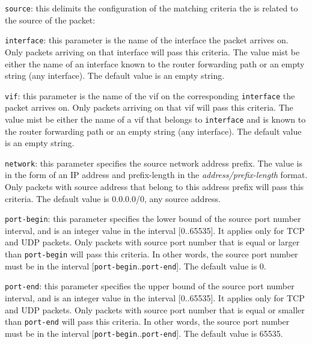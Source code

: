 \begin{description}
\begin{description}
\item{\tt source}: this delimits the configuration of the matching
  criteria the is related to the source of the packet:
\begin{description}
\item{\tt interface}: this parameter is the name of the interface
  the packet arrives on. Only packets arriving on that interface will
  pass this criteria. The value mist be either the name of an interface
  known to the router forwarding path or an empty string (\ie any
  interface). The default value is an empty string.
\item{\tt vif}: this parameter is the name of the vif on the
  corresponding {\tt interface} the packet arrives on. Only packets
  arriving on that vif will pass this criteria. The value mist be either
  the name of a vif that belongs to {\tt interface} and is known to the
  router forwarding path or an empty string (\ie any interface). The
  default value is an empty string.
\item{\tt network}: this parameter specifies the source network address
  prefix. The value is in the form of an IP address and prefix-length in
  the {\it address/prefix-length} format. Only packets with source
  address that belong to this address prefix will pass this criteria.
  The default value is 0.0.0.0/0, \ie any source address.
\item{\tt port-begin}: this parameter specifies the lower bound of the
  source port number interval, and is an integer value in the interval
  [0..65535]. It applies only for TCP and UDP packets.
  Only packets with source port number that is equal or larger than
  {\tt port-begin} will pass this criteria. In other words, the source
  port number must be in the interval
  [{\tt port-begin}..{\tt port-end}]. The default value is 0.
\item{\tt port-end}: this parameter specifies the upper bound of the
  source port number interval, and is an integer value in the interval
  [0..65535]. It applies only for TCP and UDP packets.
  Only packets with source port number that is equal or smaller than
  {\tt port-end} will pass this criteria. In other words, the source
  port number must be in the interval
  [{\tt port-begin}..{\tt port-end}]. The default value is 65535.
\end{description}


\end{description}
\end{description}
